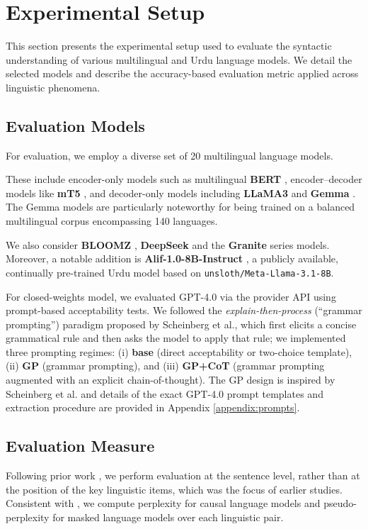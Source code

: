 \documentclass[11pt]{article}
\begin{document}
\section{Experimental Setup}
This section presents the experimental setup used to evaluate the syntactic understanding of various multilingual and Urdu language models. We detail the selected models and describe the accuracy-based evaluation metric applied across linguistic phenomena.

\subsection{Evaluation Models}
For evaluation, we employ a diverse set of 20 multilingual 
language models. 

These include encoder-only models such as multilingual \textbf{BERT} \cite{bert} , encoder–decoder models like \textbf{mT5} \cite{mt5}, and decoder-only models including \textbf{LLaMA3} \cite{llama3} and \textbf{Gemma} \cite{gemma_2025}. The Gemma models are particularly noteworthy for being trained on a balanced multilingual corpus encompassing 140 languages. 

We also consider \textbf{BLOOMZ} \cite{bloomz}, \textbf{DeepSeek} \cite{deepseekai} and 
the \textbf{Granite} series \cite{granite} models. %
Moreover, a notable addition is \textbf{Alif-1.0-8B-Instruct} \cite{alif}, a publicly available, continually pre-trained Urdu model based on \texttt{unsloth/Meta-Llama-3.1-8B}.

For closed-weights model, we evaluated GPT-4.0 via the provider API using prompt-based acceptability tests. We followed the \emph{explain-then-process} (``grammar prompting'') paradigm proposed by Scheinberg et al., which first elicits a concise grammatical rule and then asks the model to apply that rule; we implemented three prompting regimes: (i) \textbf{base} (direct acceptability or two-choice template), (ii) \textbf{GP} (grammar prompting), and (iii) \textbf{GP+CoT} (grammar prompting augmented with an explicit chain-of-thought). The GP design is inspired by Scheinberg et al. \cite{scheinberg} and details of the exact GPT-4.0 prompt templates and extraction procedure are provided in Appendix \ref{appendix:prompts}.

\subsection{Evaluation Measure}
Following prior work \cite{sling, multiblimp}, we perform evaluation 
at the sentence level, rather than at the position of the key linguistic items, which was the focus of earlier studies. Consistent with \citep{sling}, we compute perplexity \cite{perplexity} for causal language models and pseudo-perplexity for masked language models over each linguistic pair.
\end{document}
